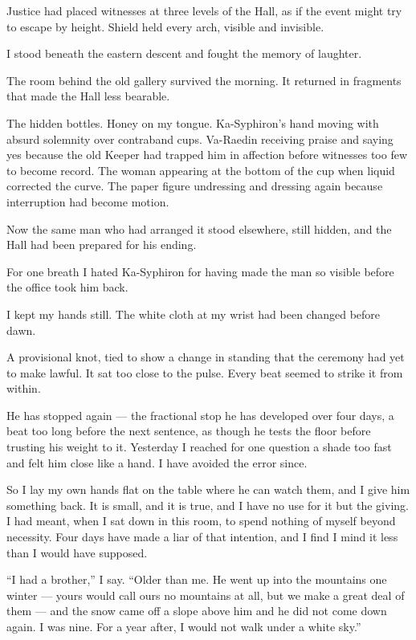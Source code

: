 Justice had placed witnesses at three levels of the Hall, as if the event might try to escape by height.
Shield held every arch, visible and invisible.\par
I stood beneath the eastern descent and fought the memory of laughter.\par
The room behind the old gallery survived the morning.
It returned in fragments that made the Hall less bearable.\par
The hidden bottles.
Honey on my tongue.
Ka-Syphiron's hand moving with absurd solemnity over contraband cups.
Va-Raedin receiving praise and saying yes because the old Keeper had trapped him in affection before witnesses too few to become record.
The woman appearing at the bottom of the cup when liquid corrected the curve.
The paper figure undressing and dressing again because interruption had become motion.\par
Now the same man who had arranged it stood elsewhere, still hidden, and the Hall had been prepared for his ending.\par
For one breath I hated Ka-Syphiron for having made the man so visible before the office took him back.\par
I kept my hands still.
The white cloth at my wrist had been changed before dawn.\par
A provisional knot, tied to show a change in standing that the ceremony had yet to make lawful.
It sat too close to the pulse.
Every beat seemed to strike it from within.\par

\ornament

He has stopped again --- the fractional stop he has developed over four days, a beat too long before the next sentence, as though he tests the floor before trusting his weight to it. Yesterday I reached for one question a shade too fast and felt him close like a hand. I have avoided the error since.\par

So I lay my own hands flat on the table where he can watch them, and I give him something back. It is small, and it is true, and I have no use for it but the giving. I had meant, when I sat down in this room, to spend nothing of myself beyond necessity. Four days have made a liar of that intention, and I find I mind it less than I would have supposed.\par

``I had a brother,'' I say. ``Older than me. He went up into the mountains one winter --- yours would call ours no mountains at all, but we make a great deal of them --- and the snow came off a slope above him and he did not come down again. I was nine. For a year after, I would not walk under a white sky.''\par

